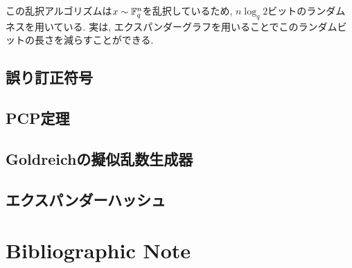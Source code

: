 この乱択アルゴリズムは$x\sim\mathbb{F}_q^n$を乱択しているため, $n\log_q 2$ビットのランダムネスを用いている.
実は, エクスパンダーグラフを用いることでこのランダムビットの長さを減らすことができる.


\subsection{誤り訂正符号}

\subsection{PCP定理}

\subsection{Goldreichの擬似乱数生成器}

\subsection{エクスパンダーハッシュ}

\section{Bibliographic Note}
